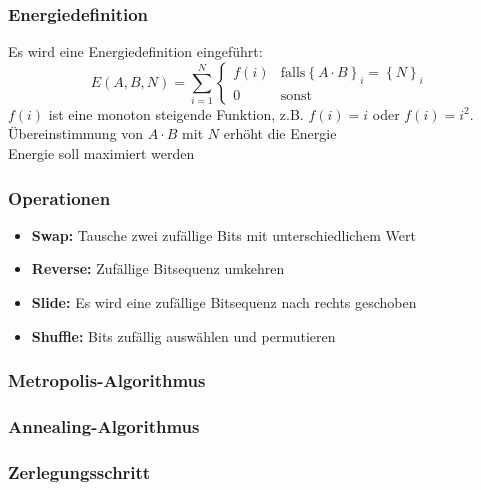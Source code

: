 \begin{frame}
  \frametitle{Energiedefinition}
  Es wird eine Energiedefinition eingeführt:
  \begin{equation*}
    E\left(A,B,N\right)=\sum\limits_{i=1}^N\begin{cases}f\left(i\right) & \mathrm{falls} {\left\{A\cdot B\right\}}_i={\left\{N\right\}}_i \\ 0 & \mathrm{sonst}\end{cases}
  \end{equation*}
  $f\left(i\right)$ ist eine monoton steigende Funktion, z.B. $f\left(i\right)=i$ oder $f\left(i\right)=i^2$. \\
  \Rightarrow{} Übereinstimmung von $A\cdot B$ mit $N$ erhöht die Energie \\
  \Rightarrow{} Energie soll maximiert werden
\end{frame}

\begin{frame}
  \frametitle{Operationen}
  \begin{itemize}
    \setlength{\itemsep}{5pt}
    \item\textbf{Swap:} Tausche zwei zufällige Bits mit unterschiedlichem Wert
    \item\textbf{Reverse:} Zufällige Bitsequenz umkehren
    \item\textbf{Slide:} Es wird eine zufällige Bitsequenz nach rechts geschoben
    \item\textbf{Shuffle:} Bits zufällig auswählen und permutieren
  \end{itemize}
\end{frame}

\begin{frame}
  \frametitle{Metropolis-Algorithmus}
  
\end{frame}

\begin{frame}
  \frametitle{Annealing-Algorithmus}
  
\end{frame}

\begin{frame}
  \frametitle{Zerlegungsschritt}
  
\end{frame}
